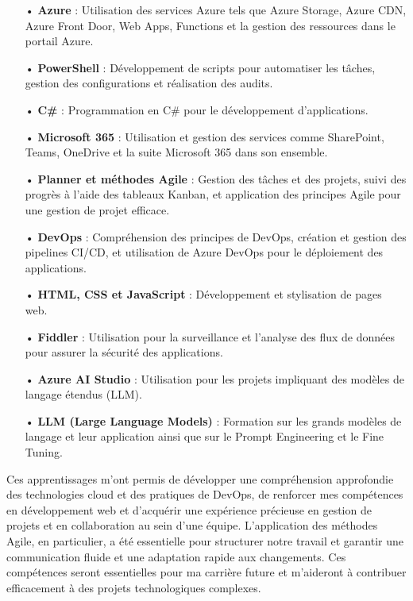 \begin{itemize}
    \item[•] \textbf{Azure} : Utilisation des services Azure tels que Azure Storage, Azure CDN, Azure Front Door, Web Apps, Functions et la gestion des ressources dans le portail Azure.
    \item[•] \textbf{PowerShell} : Développement de scripts pour automatiser les tâches, gestion des configurations et réalisation des audits.
    \item[•] \textbf{C\#} : Programmation en C\# pour le développement d'applications.
    \item[•] \textbf{Microsoft 365} : Utilisation et gestion des services comme SharePoint, Teams, OneDrive et la suite Microsoft 365 dans son ensemble.
    \item[•] \textbf{Planner et méthodes Agile} : Gestion des tâches et des projets, suivi des progrès à l'aide des tableaux Kanban, et application des principes Agile pour une gestion de projet efficace.
    \item[•] \textbf{DevOps} : Compréhension des principes de DevOps, création et gestion des pipelines CI/CD, et utilisation de Azure DevOps pour le déploiement des applications.
    \item[•] \textbf{HTML, CSS et JavaScript} : Développement et stylisation de pages web.
    \item[•] \textbf{Fiddler} : Utilisation pour la surveillance et l'analyse des flux de données pour assurer la sécurité des applications.
    \item[•] \textbf{Azure AI Studio} : Utilisation pour les projets impliquant des modèles de langage étendus (LLM).
    \item[•] \textbf{LLM (Large Language Models)} : Formation sur les grands modèles de langage et leur application ainsi que sur le Prompt Engineering et le Fine Tuning.
\end{itemize}

Ces apprentissages m'ont permis de développer une compréhension approfondie des technologies cloud et des pratiques de DevOps, de renforcer mes compétences en développement web et d'acquérir une expérience précieuse en gestion de projets et en collaboration au sein d'une équipe. L'application des méthodes Agile, en particulier, a été essentielle pour structurer notre travail et garantir une communication fluide et une adaptation rapide aux changements. Ces compétences seront essentielles pour ma carrière future et m'aideront à contribuer efficacement à des projets technologiques complexes.
